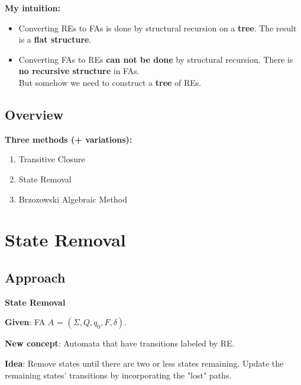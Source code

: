 \documentclass{beamer}
\begin{document}
\begin{frame}
    \textbf{My intuition:} 
    \begin{itemize}
        \item
            Converting REs to FAs is done by structural recursion on a \textbf{tree}. The result is a \textbf{flat structure}.

            \pause

        \item
            Converting FAs to REs \textbf{can not be done} by structural recursion.
            There is \textbf{no recursive structure} in FAs. \\
            But somehow we need to construct a \textbf{tree} of REs.
    \end{itemize}



\end{frame}

\subsection*{Overview}
\begin{frame}

    \textbf{Three methods (+ variations):}

    \begin{enumerate}
        \item Transitive Closure
        \item State Removal
        \item Brzozowski Algebraic Method
    \end{enumerate}

\end{frame}


\section{State Removal}
\subsection*{Approach}
\begin{frame}
    \textbf{State Removal}    

    \textbf{Given}: FA $A$ = $(\Sigma, Q, q_0, F, \delta)$.

    \textbf{New concept}: Automata that have transitions labeled by RE.

    \textbf{Idea}: Remove states until there are two or less states remaining. Update the remaining states' transitions by incorporating the "lost" paths.


\end{frame}
\end{document}
